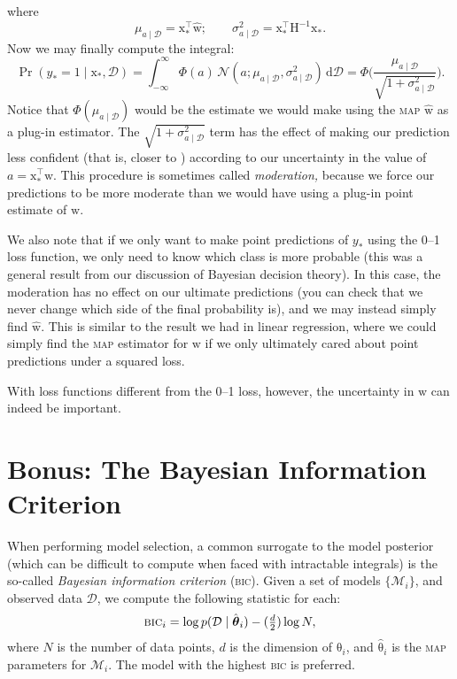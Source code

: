 \documentclass{article}
\newcommand{\acro}[1]{\textsc{\MakeLowercase{#1}}}
\newcommand{\given}{\mid}
\newcommand{\mc}[1]{\mathcal{#1}}
\newcommand{\data}{\mc{D}}
\newcommand{\model}{\mc{M}}
\newcommand{\intd}[1]{\,\mathrm{d}{#1}}
\newcommand{\inv}{^{-1}}
\newcommand{\trans}{^\top}
\newcommand{\mat}[1]{\bm{\mathrm{#1}}}
\renewcommand{\vec}[1]{\bm{\mathrm{#1}}}
\begin{document}
where
\begin{equation*}
  \mu_{a \given \data} = \vec{x}_\ast\trans \hat{\vec{w}};
  \qquad
  \sigma^2_{a \given \data} = \vec{x}_\ast\trans \mat{H}\inv \vec{x}_\ast.
\end{equation*}
Now we may finally compute the integral:
\begin{equation*}
  \Pr(y_\ast = 1 \given \vec{x}_\ast, \data)
  =
  \int_{-\infty}^\infty
  \Phi(a)
  \,
  \mc{N}(a; \mu_{a \given \data}, \sigma^2_{a \given \data})
  \intd{\data}
  =
  \Phi
  \Biggl(
  \frac{\mu_{a \given \data}}{\sqrt{1 + \sigma^2_{a \given \data}}}
  \Biggr).
\end{equation*}
Notice that $\Phi(\mu_{a \given \data})$ would be the estimate we
would make using the \acro{MAP} $\hat{\vec{w}}$ as a plug-in
estimator.  The $\sqrt{1 + \sigma^2_{a \given \data}}$ term has the
effect of making our prediction less confident (that is, closer to
) according to our uncertainty in the value of $a =
\vec{x}_\ast\trans \vec{w}$.  This procedure is sometimes called
\emph{moderation,} because we force our predictions to be more
moderate than we would have using a plug-in point estimate of
$\vec{w}$.

We also note that if we only want to make point predictions of
$y_\ast$ using the 0--1 loss function, we only need to know which
class is more probable (this was a general result from our discussion
of Bayesian decision theory).  In this case, the moderation has no
effect on our ultimate predictions (you can check that we never change
which side of  the final probability is), and we may
instead simply find $\hat{\vec{w}}$.  This is similar to the result we
had in linear regression, where we could simply find the \acro{MAP}
estimator for $\vec{w}$ if we only ultimately cared about point
predictions under a squared loss.

With loss functions different from the 0--1 loss, however, the
uncertainty in $\vec{w}$ can indeed be important.

\section*{Bonus: The Bayesian Information Criterion}

When performing model selection, a common surrogate to the model
posterior (which can be difficult to compute when faced with
intractable integrals) is the so-called \emph{Bayesian information
  criterion} (\acro{BIC}).  Given a set of models $\{ \model_i \}$,
and observed data $\data$, we compute the following statistic for each:
\begin{equation*}
  \textstyle
  \text{\acro{BIC}}_i
  =
  \log p(\data \given \hat{\vec{\theta}}_i)
  -
  (\frac{d}{2}) \log N,
\end{equation*}
where $N$ is the number of data points, $d$ is the dimension of
$\vec{\theta}_i$, and $\hat{\vec{\theta}}_i$ is the \acro{MAP}
parameters for $\model_i$.  The model with the highest \acro{BIC} is
preferred.
\end{document}
